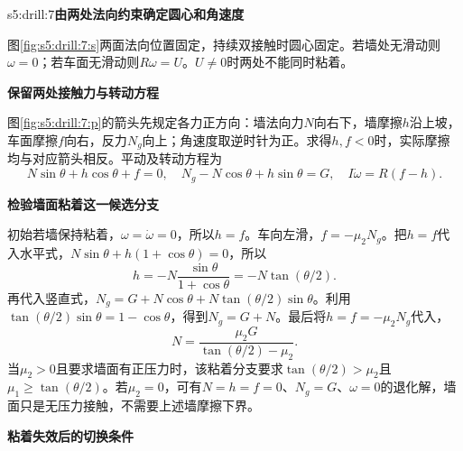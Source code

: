 \begin{drillsolution}{s5:drill:7}\textbf{由两处法向约束确定圆心和角速度}\par
图\ref{fig:s5:drill:7:s}两面法向位置固定，持续双接触时圆心固定。若墙处无滑动则$\omega=0$；若车面无滑动则$R\omega=U$。$U\ne0$时两处不能同时粘着。

\par\medskip{}\noindent\textbf{保留两处接触力与转动方程}\par
图\ref{fig:s5:drill:7:p}的箭头先规定各力正方向：墙法向力$N$向右下，墙摩擦$h$沿上坡，车面摩擦$f$向右，反力$N_g$向上；角速度取逆时针为正。求得$h,f<0$时，实际摩擦均与对应箭头相反。平动及转动方程为
\[
N\sin\theta+h\cos\theta+f=0,\quad
N_g-N\cos\theta+h\sin\theta=G,\quad
I\dot\omega=R(f-h).
\]

\par\medskip{}\noindent\textbf{检验墙面粘着这一候选分支}\par
初始若墙保持粘着，$\omega=\dot\omega=0$，所以$h=f$。车向左滑，$f=-\mu_2N_g$。把$h=f$代入水平式，$N\sin\theta+h(1+\cos\theta)=0$，所以
\[
h=-N\frac{\sin\theta}{1+\cos\theta}=-N\tan(\theta/2).
\]
再代入竖直式，$N_g=G+N\cos\theta+N\tan(\theta/2)\sin\theta$。利用$\tan(\theta/2)\sin\theta=1-\cos\theta$，得到$N_g=G+N$。最后将$h=f=-\mu_2N_g$代入，
\[
N=\frac{\mu_2G}{\tan(\theta/2)-\mu_2}.
\]
当$\mu_2>0$且要求墙面有正压力时，该粘着分支要求$\tan(\theta/2)>\mu_2$且$\mu_1\ge\tan(\theta/2)$。若$\mu_2=0$，可有$N=h=f=0$、$N_g=G$、$\omega=0$的退化解，墙面只是无压力接触，不需要上述墙摩擦下界。
\par\medskip{}\noindent\textbf{粘着失效后的切换条件}\par
{}
\end{drillsolution}
